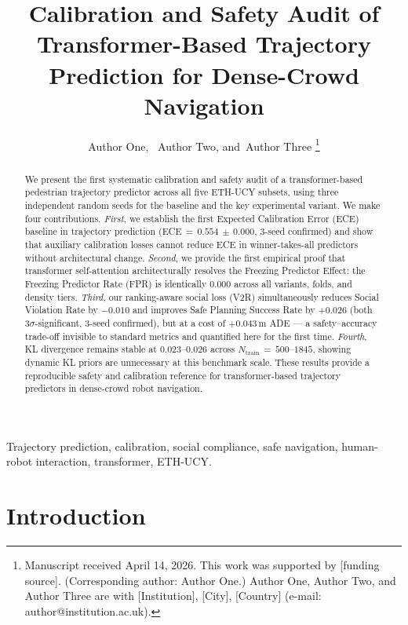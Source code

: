 \documentclass[journal]{IEEEtran}
\title{Calibration and Safety Audit of Transformer-Based
       Trajectory Prediction for Dense-Crowd Navigation}
\author{Author One,~\IEEEmembership{Member,~IEEE,}
        Author Two,
        and~Author Three
\thanks{Manuscript received April 14, 2026.
This work was supported by [funding source].
(Corresponding author: Author One.)
Author One, Author Two, and Author Three are with
[Institution], [City], [Country]
(e-mail: author@institution.ac.uk).}}
\begin{document}
\IEEEoverridecommandlockouts

\maketitle

\begin{abstract}
We present the first systematic calibration and safety audit of a
transformer-based pedestrian trajectory predictor across all five
ETH-UCY subsets, using three independent random seeds for the
baseline and the key experimental variant.
We make four contributions.
\emph{First}, we establish the first Expected Calibration Error (ECE)
baseline in trajectory prediction (ECE\,\(=\,0.554\,\pm\,0.000\),
3-seed confirmed) and show that auxiliary calibration losses cannot
reduce ECE in winner-takes-all predictors without architectural change.
\emph{Second}, we provide the first empirical proof that transformer
self-attention architecturally resolves the Freezing Predictor Effect:
the Freezing Predictor Rate (FPR) is identically 0.000 across all
variants, folds, and density tiers.
\emph{Third}, our ranking-aware social loss (V2R) simultaneously
reduces Social Violation Rate by \(-0.010\) and improves Safe Planning
Success Rate by \(+0.026\) (both \(3\sigma\)-significant, 3-seed
confirmed), but at a cost of \(+0.043\)\,m ADE --- a safety--accuracy
trade-off invisible to standard metrics and quantified here for the
first time.
\emph{Fourth}, KL divergence remains stable at \(0.023\)--\(0.026\)
across \(N_{\text{train}}\,{=}\,500\)--\(1845\), showing dynamic KL
priors are unnecessary at this benchmark scale.
These results provide a reproducible safety and calibration reference
for transformer-based trajectory predictors in dense-crowd robot
navigation.
\end{abstract}

\begin{IEEEkeywords}
Trajectory prediction, calibration, social compliance, safe navigation,
human-robot interaction, transformer, ETH-UCY.
\end{IEEEkeywords}

\section{Introduction}
\label{sec:intro}
\end{document}
